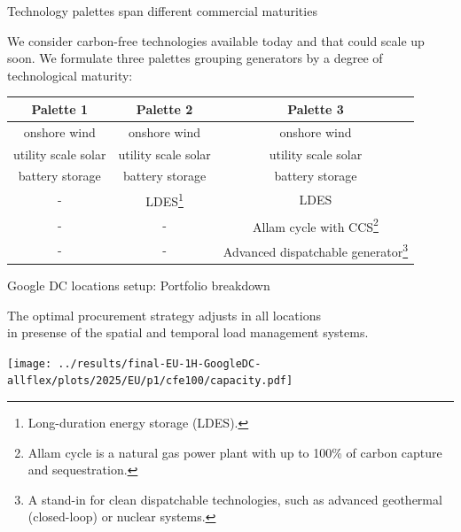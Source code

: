 \begin{frame}{Technology palettes span different commercial maturities}

  {\small

  We consider carbon-free technologies available today and that could scale up soon.
  We formulate \alert{three palettes} grouping generators by a degree of technological
  maturity:

  \centering
  \begin{table}[h]
  \begin{tabular}{ccc}
    \hline
    \alert{Palette 1} & \alert{Palette 2} &  \alert{Palette 3} \\
    \hline
      onshore wind & onshore wind  & onshore wind \\
    \hline
      utility scale solar & utility scale solar  & utility scale solar \\
    \hline
      battery storage & battery storage  & battery storage \\
    \hline
      - & LDES\footnote{{\scriptsize Long-duration energy storage (LDES).}} & LDES \\
    \hline
      - & - & Allam cycle with CCS\footnote{{\scriptsize Allam cycle is a natural gas power plant
      with up to 100\% of carbon capture and sequestration.}}  \\
    \hline
      - & - & Advanced dispatchable generator\footnote{{\scriptsize A stand-in for clean dispatchable technologies,
      such as advanced geothermal (closed-loop) or nuclear systems.}} \\
  \end{tabular}
  \end{table}
  }
  \vspace{0.5cm}

\end{frame}



\begin{frame}{Google DC locations setup: Portfolio breakdown}

  \centering
  {\footnotesize
  The optimal procurement strategy adjusts in all locations \\ 
  in presense of the \alert{spatial} and \alert{temporal} load management systems. 
  }
  
\texttt{[image: ../results/final-EU-1H-GoogleDC-allflex/plots/2025/EU/p1/cfe100/capacity.pdf]}

\end{frame}



